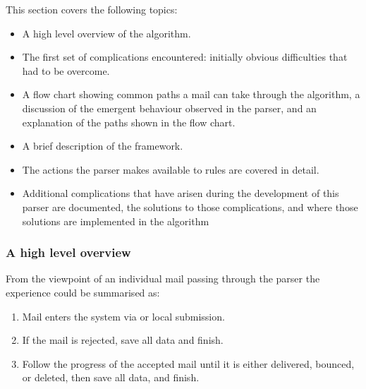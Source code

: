 This section covers the following topics:

\begin{itemize}

    \item A high level overview of the algorithm.

    \item The first set of complications encountered: initially obvious
        difficulties that had to be overcome.

    \item A flow chart showing common paths a mail can take through the
        algorithm, a discussion of the emergent behaviour observed in the
        parser, and an explanation of the paths shown in the flow chart.

    \item A brief description of the framework.

    \item The actions the parser makes available to rules are covered in
        detail.

    \item Additional complications that have arisen during the development
        of this parser are documented, the solutions to those
        complications, and where those solutions are implemented in the
        algorithm

\end{itemize}

\subsubsection{A high level overview}

From the viewpoint of an individual mail passing through the parser the
experience could be summarised as:

\begin{enumerate}

    \item Mail enters the system via \SMTP{} or local submission.

    \item If the mail is rejected, save all data and finish.

    \item Follow the progress of the accepted mail until it is either
        delivered, bounced, or deleted, then save all data, and finish.

\end{enumerate}

